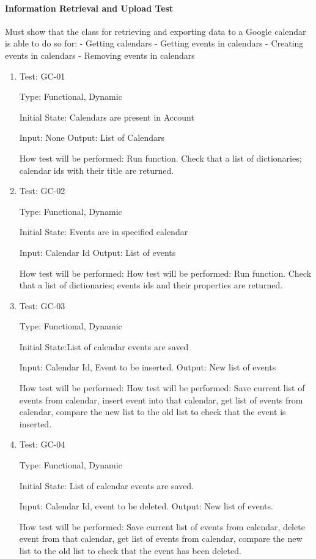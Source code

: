 \documentclass[12pt, titlepage]{article}
\begin{document}
\paragraph{Information Retrieval and Upload Test}
Must show that the class for retrieving and exporting data to a Google calendar is able to do so for:
- Getting calendars
- Getting events in calendars
- Creating events in calendars
- Removing events in calendars

\begin{enumerate}

\item{Test: GC-01\\}

Type: Functional, Dynamic
					
Initial State: Calendars are present in Account
					
Input: None
Output: List of Calendars
					
How test will be performed: Run function. Check that a list of dictionaries; calendar ids with their title are returned.

\item{Test: GC-02\\}

Type: Functional, Dynamic
					
Initial State: Events are in specified calendar
					
Input: Calendar Id
Output: List of events
					
How test will be performed: How test will be performed: Run function. Check that a list of dictionaries; events ids and their properties are returned.

\item{Test: GC-03\\}

Type: Functional, Dynamic
					
Initial State:List of calendar events are saved
					
Input: Calendar Id, Event to be inserted.
Output: New list of events
					
How test will be performed: How test will be performed: Save current list of events from calendar, insert event into that calendar, get list of events from calendar, compare the new list to the old list to check that the event is inserted. 

\item{Test: GC-04\\}

Type: Functional, Dynamic
					
Initial State: List of calendar events are saved.

					
Input: Calendar Id, event to be deleted. 
Output: New list of events.
					
How test will be performed: Save current list of events from calendar, delete event from that calendar, get list of events from calendar, compare the new list to the old list to check that the event has been deleted.

\end{enumerate}
\end{document}
